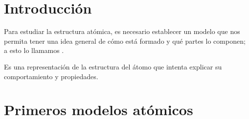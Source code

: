 
\section{Introducción}
Para estudiar la estructura atómica, es necesario establecer un modelo que nos permita tener una idea general de cómo está formado y qué partes lo componen; a esto lo llamamos .
\vspace{6pt}
\begin{definition}
    Es una representación de la estructura del átomo que intenta explicar su comportamiento y propiedades.
\end{definition}


\section{Primeros modelos atómicos}

